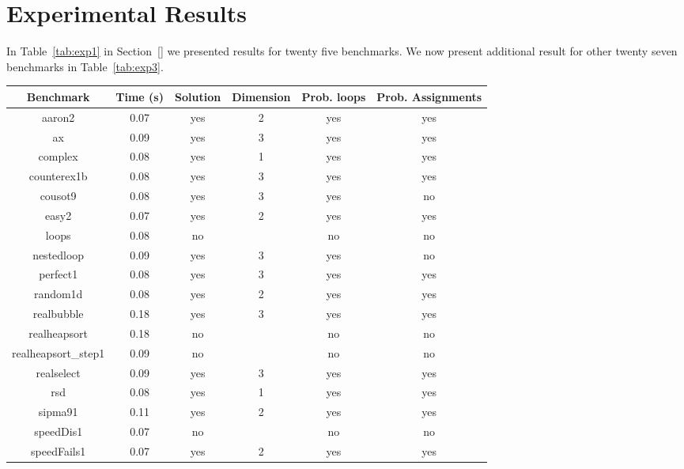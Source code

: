 
\section{Experimental Results}\label{sec:app_ex}
In Table~\ref{tab:exp1} in Section~\ref{} we presented results for twenty five benchmarks.
We now present additional result for other twenty seven benchmarks in Table~\ref{tab:exp3}.



\begin{center}
\begin{table}[]
  \centering
   \begin{tabular}{c|c|c|c|c|c}
    
   {Benchmark} & {Time (s)} & {Solution} & {Dimension} & {Prob. loops} & {Prob. Assignments
} \\\hline
{aaron2} & {0.07} & {yes} & {2} & {yes} & {yes
} \\\hline
{ax} & {0.09} & {yes} & {3} & {yes} & {yes
} \\\hline
{complex} & {0.08} & {yes} & {1} & {yes} & {yes
} \\\hline
{counterex1b} & {0.08} & {yes} & {3} & {yes} & {yes
} \\\hline
{cousot9} & {0.08} & {yes} & {3} & {yes} & {no
} \\\hline
{easy2} & {0.07} & {yes} & {2} & {yes} & {yes
} \\\hline
{loops} & {0.08} & {no} & {} & {no} & {no
} \\\hline
{nestedloop} & {0.09} & {yes} & {3} & {yes} & {no
} \\\hline
{perfect1} & {0.08} & {yes} & {3} & {yes} & {yes
} \\\hline
{random1d} & {0.08} & {yes} & {2} & {yes} & {yes
} \\\hline
{realbubble} & {0.18} & {yes} & {3} & {yes} & {yes
} \\\hline
{realheapsort} & {0.18} & {no} & {} & {no} & {no
} \\\hline
{realheapsort\_step1} & {0.09} & {no} & {} & {no} & {no
} \\\hline
{realselect} & {0.09} & {yes} & {3} & {yes} & {yes
} \\\hline
{rsd} & {0.08} & {yes} & {1} & {yes} & {yes
} \\\hline
{sipma91} & {0.11} & {yes} & {2} & {yes} & {yes
} \\\hline
{speedDis1} & {0.07} & {no} & {} & {no} & {no
} \\\hline
{speedFails1} & {0.07} & {yes} & {2} & {yes} & {yes
}
\end{tabular}
\end{table}
\end{center}
